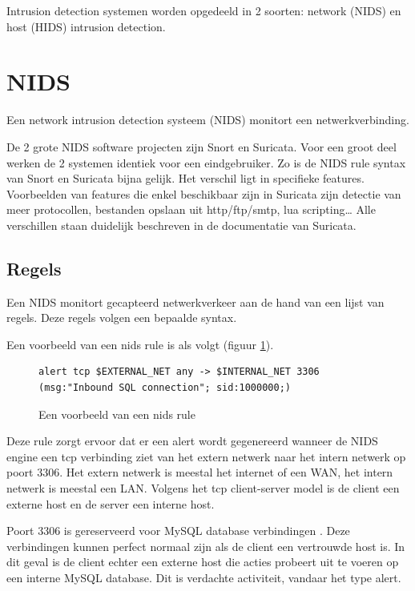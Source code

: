 \documentclass[a4paper,12pt]{report}
\begin{document}
Intrusion detection systemen worden opgedeeld in 2 soorten: network (NIDS) en host (HIDS) intrusion detection.

\section{NIDS}
Een network intrusion detection systeem (NIDS) monitort een netwerkverbinding.

De 2 grote NIDS software projecten zijn Snort en Suricata.
Voor een groot deel werken de 2 systemen identiek voor een eindgebruiker.
Zo is de NIDS rule syntax van Snort en Suricata bijna gelijk.
Het verschil ligt in specifieke features.
Voorbeelden van features die enkel beschikbaar zijn in Suricata zijn detectie van meer protocollen, bestanden opslaan uit http/ftp/smtp, lua scripting\dots
Alle verschillen staan duidelijk beschreven in de documentatie van Suricata.
\autocite{suricata:docs}

\subsection{Regels}
Een NIDS monitort gecapteerd netwerkverkeer aan de hand van een lijst van regels.
Deze regels volgen een bepaalde syntax.

Een voorbeeld van een nids rule is als volgt (figuur \ref{fig:nids-rule}).

\begin{figure}[H]
  \begin{lstlisting}
alert tcp $EXTERNAL_NET any -> $INTERNAL_NET 3306 (msg:"Inbound SQL connection"; sid:1000000;)
  \end{lstlisting}
  \caption{Een voorbeeld van een nids rule}
  \label{fig:nids-rule}
\end{figure}

Deze rule zorgt ervoor dat er een alert wordt gegenereerd wanneer de NIDS engine een tcp verbinding ziet van het extern netwerk naar het intern netwerk op poort 3306.
Het extern netwerk is meestal het internet of een WAN, het intern netwerk is meestal een LAN.
Volgens het tcp client-server model is de client een externe host en de server een interne host.

Poort 3306 is gereserveerd voor MySQL database verbindingen \autocite{iana:ports}.
Deze verbindingen kunnen perfect normaal zijn als de client een vertrouwde host is.
In dit geval is de client echter een externe host die acties probeert uit te voeren op een interne MySQL database.
Dit is verdachte activiteit, vandaar het type alert.
\end{document}
